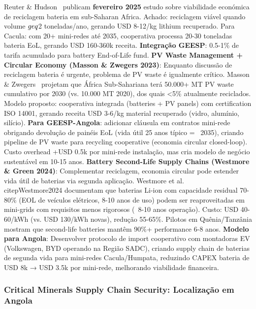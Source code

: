\documentclass[12pt, a4paper]{article}
\begin{document}
Reuter \& Hudson~\citep{Reuter2025} publicam
\textbf{fevereiro 2025} estudo sobre viabilidade económica de reciclagem bateria em sub-Saharan Africa. Achado: reciclagem viável quando volume $\\geq$2 toneladas/ano, gerando USD 8-12/kg lithium recuperado. Para Cacula: com 20+ mini-redes até 2035, cooperativa processa 20-30 toneladas bateria EoL, gerando USD 160-360k receita.
\textbf{Integração GEESP}: 0.5-1\% de tarifa acumulado para battery End-of-Life fund.
\textbf{PV Waste Management + Circular Economy (Masson \& Zwegers 2023)}: Enquanto discussão de reciclagem bateria é urgente, problema de PV waste é igualmente crítico. Masson \& Zwegers~\citep{Masson2023} projetam que África Sub-Sahariana terá 50.000+ MT PV waste cumulativo por 2030 (vs. 10.000 MT 2020), dos quais <5\% atualmente reciclados. Modelo proposto: cooperativa integrada (batteries + PV panels) com certification ISO 14001, gerando receita USD 3-6/kg material recuperado (vidro, alumínio, silício).
\textbf{Para GEESP-Angola}: adicionar cláusula em contratos mini-rede obrigando devolução de painéis EoL (vida útil 25 anos típico = ~2035), criando pipeline de PV waste para recycling cooperative (economia circular closed-loop). Custo overhead +USD 0.5k por mini-rede instalação, mas cria modelo de negócio sustentável em 10-15 anos.
\textbf{Battery Second-Life Supply Chains (Westmore \& Green 2024)}: Complementar reciclagem, economia circular pode estender vida útil de baterias via segunda aplicação. Westmore et al.~\\citep{Westmore2024} documentam que baterias Li-ion com capacidade residual 70-80\% (EOL de veículos elétricos, 8-10 anos de uso) podem ser reaproveitadas em mini-grids com requisitos menos rigorosos (~8-10 anos operação). Custo: USD 40-60/kWh (vs. USD 130/kWh novas), redução 55-65\%. Pilotos em Quênia/Tanzânia mostram que second-life batteries mantêm 90\%+ performance 6-8 anos.
\textbf{Modelo para Angola}: Desenvolver protocolo de import cooperativo com montadoras EV (Volkswagen, BYD operando na Região SADC), criando supply chain de baterias de segunda vida para mini-redes Cacula/Humpata, reduzindo CAPEX bateria de USD 8k → USD 3.5k por mini-rede, melhorando viabilidade financeira.

\subsubsection{Critical Minerals Supply Chain Security: Localização em Angola}
\end{document}
